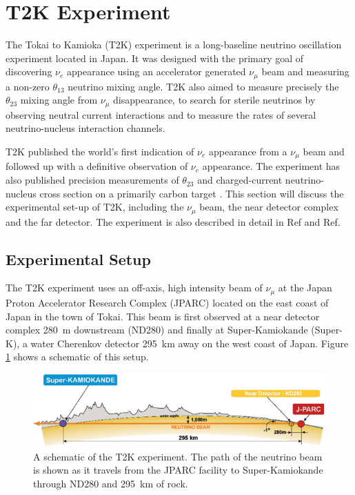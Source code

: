 \section{T2K Experiment}
\label{sec:detectordescription}

The Tokai to Kamioka (T2K) experiment is a long-baseline neutrino oscillation experiment located in Japan. It was designed with the primary goal of discovering $\nu_e$ appearance using an accelerator generated $\nu_\mu$ beam and measuring a non-zero $\theta_{13}$ neutrino mixing angle. T2K also aimed to measure precisely the $\theta_{23}$ mixing angle from $\nu_{\mu}$ disappearance, to search for sterile neutrinos by observing neutral current interactions and to measure the rates of several neutrino-nucleus interaction channels.

T2K published the world's first indication of $\nu_e$ appearance from a $\nu_\mu$ beam\cite{nueApp1} and followed up with a definitive observation of $\nu_e$ appearance\cite{nueApp3}. The experiment has also published precision measurements of $\theta_{23}$ \cite{muDis} and charged-current neutrino-nucleus cross section on a primarily carbon target \cite{ccinc}. This section will discuss the experimental set-up of T2K, including the $\nu_\mu$ beam, the near detector complex and the far detector. The experiment is also described in detail in Ref\cite{t2kex} and Ref\cite{p0dnim}.

\subsection{Experimental Setup}

The T2K experiment uses an off-axis, high intensity beam of $\nu_\mu$ at the Japan Proton Accelerator Research Complex (JPARC) located on the east coast of Japan in the town of Tokai. This beam is first observed at a near detector complex 280~m downstream (ND280) and finally at Super-Kamiokande (Super-K), a water Cherenkov detector 295~km away on the west coast of Japan. Figure \ref{fig:t2k_overview} shows a schematic of this setup.

\begin{figure}[H]
\includegraphics[width=.9\textwidth]{./Figures/t2k-schematic.jpg}
\caption{A schematic of the T2K experiment. The path of the neutrino beam is shown as it travels from the JPARC facility to Super-Kamiokande through ND280 and 295~km of rock. \label{fig:t2k_overview}}
\end{figure}

